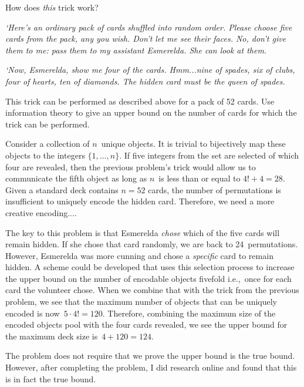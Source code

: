 \begin{problem}{15}{6}
  How does \textit{this} trick work?

  \textnormal{\textit{`Here's an ordinary pack of cards shuffled into random order.  Please choose five cards from the pack, any you wish. Don't let me see their faces. No, don't give them to me: pass them to my assistant Esmerelda.  She can look at them.}}

  \textnormal{\textit{`Now, Esmerelda, show me four of the cards.  Hmm...nine of spades, six of clubs, four of hearts, ten of diamonds. The hidden card must be the queen of spades.}}

  This trick can be performed as described above for a pack of 52 cards.  Use information theory to give an upper bound on the number of cards for which the trick can be performed.
\end{problem}

Consider a collection of $n$~unique objects.  It is trivial to bijectively map these objects to the integers $\{1,\ldots,n\}$. If five integers from the set are selected of which four are revealed, then the previous problem's trick would allow us to communicate the fifth object as long as $n$~is less than or equal to ${4! + 4 = 28}$.  Given a standard deck contains $n=52$ cards, the number of permutations is insufficient to uniquely encode the hidden card.  Therefore, we need a more creative encoding....

The key to this problem is that Esmerelda \textit{chose} which of the five cards will remain hidden.  If she chose that card randomly, we are back to 24~permutations.  However, Esmerelda was more cunning and chose a \textit{specific} card to remain hidden.  A scheme could be developed that uses this selection process to increase the upper bound on the number of encodable objects fivefold i.e.,~once for each card the volunteer chose.  When we combine that with the trick from the previous problem, we see that the maximum number of objects that can be uniquely encoded is now~${5\cdot4!=120}$.  Therefore, combining the maximum size of the encoded objects pool with the four cards revealed, we see the upper bound for the maximum deck size is~${4 + 120 = \boxed{124}}$.

The problem does not require that we prove the upper bound is the true bound.  However, after completing the problem, I did research online and found that this is in fact the true bound.
